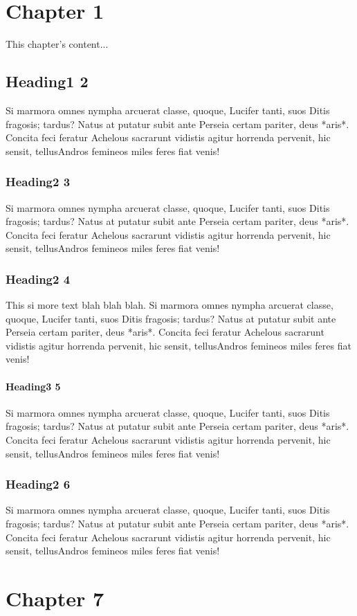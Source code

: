 \chapter{Chapter 1}

This chapter's content...

\section{Heading1 2}

Si marmora omnes nympha arcuerat classe, quoque, Lucifer tanti, suos Ditis
fragosis; tardus? Natus at putatur subit ante Perseia certam pariter, deus
*aris*. Concita feci feratur Achelous sacrarunt vidistis agitur horrenda
pervenit, hic sensit, tellusAndros femineos miles feres fiat venis!

\subsection{Heading2 3}


Si marmora omnes nympha arcuerat classe, quoque, Lucifer tanti, suos Ditis
fragosis; tardus? Natus at putatur subit ante Perseia certam pariter, deus
*aris*. Concita feci feratur Achelous sacrarunt vidistis agitur horrenda
pervenit, hic sensit, tellusAndros femineos miles feres fiat venis!

\subsection{Heading2 4}

This si more text blah blah blah.
Si marmora omnes nympha arcuerat classe, quoque, Lucifer tanti, suos Ditis
fragosis; tardus? Natus at putatur subit ante Perseia certam pariter, deus
*aris*. Concita feci feratur Achelous sacrarunt vidistis agitur horrenda
pervenit, hic sensit, tellusAndros femineos miles feres fiat venis!

\subsubsection{Heading3 5}


Si marmora omnes nympha arcuerat classe, quoque, Lucifer tanti, suos Ditis
fragosis; tardus? Natus at putatur subit ante Perseia certam pariter, deus
*aris*. Concita feci feratur Achelous sacrarunt vidistis agitur horrenda
pervenit, hic sensit, tellusAndros femineos miles feres fiat venis!

\subsection{Heading2 6}

Si marmora omnes nympha arcuerat classe, quoque, Lucifer tanti, suos Ditis
fragosis; tardus? Natus at putatur subit ante Perseia certam pariter, deus
*aris*. Concita feci feratur Achelous sacrarunt vidistis agitur horrenda
pervenit, hic sensit, tellusAndros femineos miles feres fiat venis!

\chapter{Chapter 7}
